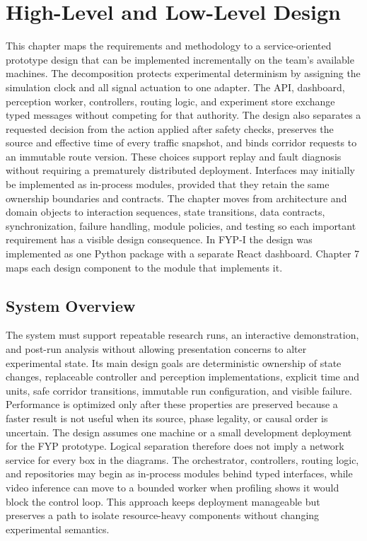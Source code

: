 \chapter{High-Level and Low-Level Design}
\label{ch:design}

This chapter maps the requirements and methodology to a service-oriented prototype design that can be implemented incrementally on the team's available machines. The decomposition protects experimental determinism by assigning the simulation clock and all signal actuation to one adapter. The API, dashboard, perception worker, controllers, routing logic, and experiment store exchange typed messages without competing for that authority. The design also separates a requested decision from the action applied after safety checks, preserves the source and effective time of every traffic snapshot, and binds corridor requests to an immutable route version. These choices support replay and fault diagnosis without requiring a prematurely distributed deployment. Interfaces may initially be implemented as in-process modules, provided that they retain the same ownership boundaries and contracts. The chapter moves from architecture and domain objects to interaction sequences, state transitions, data contracts, synchronization, failure handling, module policies, and testing so each important requirement has a visible design consequence. In FYP-I the design was implemented as one Python package with a separate React dashboard. Chapter 7 maps each design component to the module that implements it.

\section{System Overview}

The system must support repeatable research runs, an interactive demonstration, and post-run analysis without allowing presentation concerns to alter experimental state. Its main design goals are deterministic ownership of state changes, replaceable controller and perception implementations, explicit time and units, safe corridor transitions, immutable run configuration, and visible failure. Performance is optimized only after these properties are preserved because a faster result is not useful when its source, phase legality, or causal order is uncertain. The design assumes one machine or a small development deployment for the FYP prototype. Logical separation therefore does not imply a network service for every box in the diagrams. The orchestrator, controllers, routing logic, and repositories may begin as in-process modules behind typed interfaces, while video inference can move to a bounded worker when profiling shows it would block the control loop. This approach keeps deployment manageable but preserves a path to isolate resource-heavy components without changing experimental semantics.


